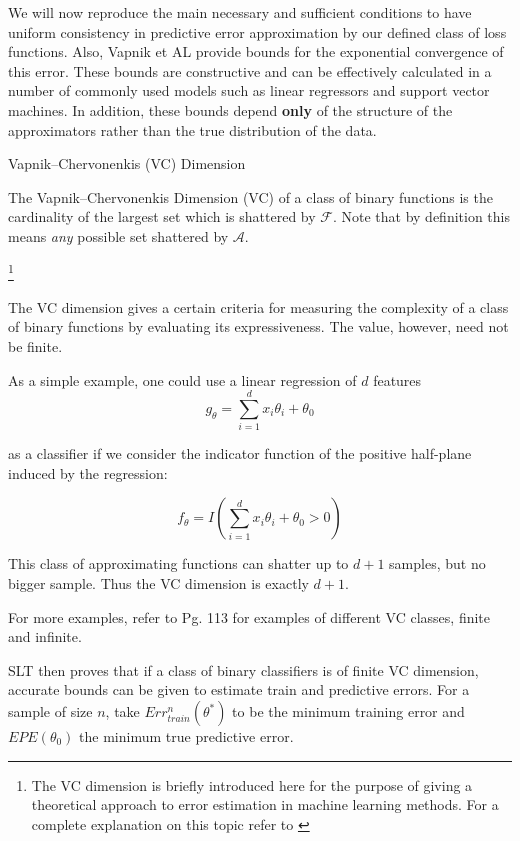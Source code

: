 We will now reproduce the main necessary and sufficient conditions to have uniform consistency in predictive error approximation by our defined class of loss functions. Also,
Vapnik et AL provide bounds for the exponential convergence of this error. These bounds are constructive and can be effectively calculated in a number of commonly used models such as linear regressors and support vector machines. In addition, these bounds depend \textbf{only} of the structure of the approximators rather than the true distribution of the data.


\begin{definition}{Vapnik--Chervonenkis (VC) Dimension}

The Vapnik--Chervonenkis Dimension (VC) of a class of binary functions is the cardinality of the largest set which is shattered by $\mathcal {F}$. Note that by definition this means \textit{any} possible set shattered by $\mathcal {A}$.
\end{definition}\footnote{The VC dimension is briefly introduced here for the purpose of giving a theoretical approach to error estimation in machine learning methods. For a complete explanation on this topic refer to \textcite{vapnik-nature2013}}

The VC dimension gives a certain criteria for measuring the complexity of a class of binary functions by evaluating its expressiveness. The value, however, need not be finite.

As a simple example, one could use a linear regression of $d$ features 
\begin{equation}
g_{\theta} = \sum_{i=1}^d x_i \theta_i + \theta_0
\end{equation}

 as a classifier if we consider the indicator function of the positive half-plane induced by the regression: 
 
\begin{equation}
f_{\theta} = I(\sum_{i=1}^d x_i \theta_i + \theta_0 > 0)
\end{equation}

This class of approximating functions can shatter up to $d+1$ samples, but no bigger sample. Thus the VC dimension is exactly $d+1$.

For more examples, refer to \textcite{cherkassky-learning2007} Pg. 113 for examples of different VC classes, finite and infinite.

SLT then proves that if a class of binary classifiers is of finite VC dimension, accurate bounds can be given to estimate train and predictive errors. For a sample of size $n$, take $Err^n_{train}(\theta^*)$ to be the minimum training error and $EPE(\theta_0)$ the minimum true predictive error.

